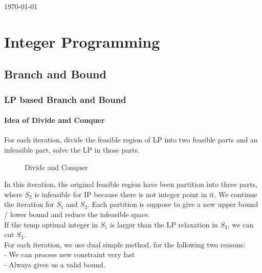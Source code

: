 

	\maketitle
	\today

	\clearpage
	\thispagestyle{plain}
	\par{}

	\tableofcontents

	\part{Integer Programming}\label{IP}
		\chapter{Branch and Bound}
			\section{LP based Branch and Bound}
				\subsection{Idea of Divide and Conquer}
					For each iteration, divide the feasible region of LP into two feasible parts and an infeasible part, solve the LP in those parts.\\
					\begin{figure}[!ht]
						\centering
						\caption{Divide and Conquer}
					\end{figure}
					In this iteration, the original feasible region have been partition into three parts, where $S_2$ is infeasible for IP because there is not integer point in it. We continue the iteration for $S_1$ and $S_2$. Each partition is suppose to give a new upper bound / lower bound and reduce the infeasible space.\\
					If the temp optimal integer in $S_1$ is larger than the LP relaxation in $S_3$, we can cut $S_3$.\\
					For each iteration, we use dual simple method, for the following two reasons:\\
					\indent - We can process new constraint very fast\\
					\indent - Always gives us a valid bound.\\

